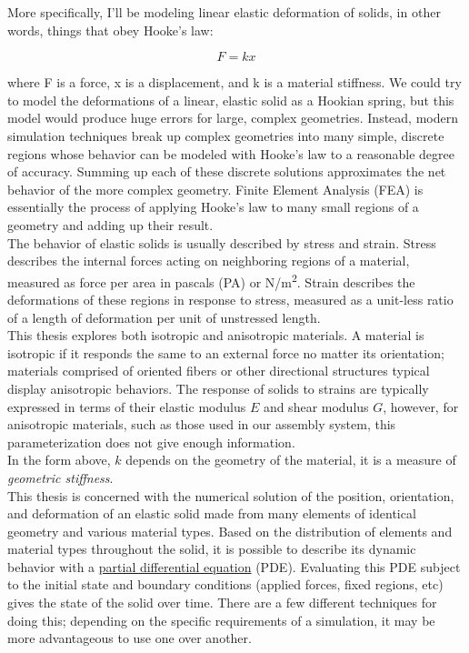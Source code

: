 {More specifically, I'll be modeling linear elastic deformation of solids, in other words, things that obey Hooke's law:

\[F = kx\]

where F is a force, x is a displacement, and k is a material stiffness.  We could try to model the deformations of a linear, elastic solid as a Hookian spring, but this model would produce huge errors for large, complex geometries.  Instead, modern simulation techniques break up complex geometries into many simple, discrete regions whose behavior can be modeled with Hooke's law to a reasonable degree of accuracy.  Summing up each of these discrete solutions approximates the net behavior of the more complex geometry.  Finite Element Analysis (FEA) is essentially the process of applying Hooke's law to many small regions of a geometry and adding up their result.\\




The behavior of elastic solids is usually described by stress and strain.  Stress describes the internal forces acting on neighboring regions of a material, measured as force per area in pascals (PA) or N/m\textsuperscript{2}.  Strain describes the deformations of these regions in response to stress, measured as a unit-less ratio of a length of deformation per unit of unstressed length.\\

This thesis explores both isotropic and anisotropic materials.  A material is isotropic if it responds the same to an external force no matter its orientation; materials comprised of oriented fibers or other directional structures typical display anisotropic behaviors.  The response of solids to strains are typically expressed in terms of their elastic modulus $E$ and shear modulus $G$, however, for anisotropic materials, such as those used in our assembly system, this parameterization does not give enough information.\\

In the form above, $k$ depends on the geometry of the material, it is a measure of \textit{geometric stiffness}.\\






This thesis is concerned with the numerical solution of the position, orientation, and deformation of an elastic solid made from many elements of identical geometry and various material types.  Based on the distribution of elements and material types throughout the solid, it is possible to describe its dynamic behavior with a \href{https://en.wikipedia.org/wiki/Partial_differential_equation}{partial differential equation} (PDE).  Evaluating this PDE subject to the initial state and boundary conditions (applied forces, fixed regions, etc) gives the state of the solid over time.  There are a few different techniques for doing this; depending on the specific requirements of a simulation, it may be more advantageous to use one over another.\\


}
